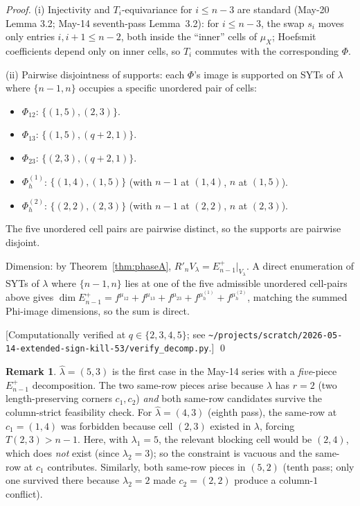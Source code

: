 \documentclass[11pt]{article}
\theoremstyle{definition}
\newtheorem{remark}[theorem]{Remark}
\newcommand{\hatl}{\widehat\lambda}
\newcommand{\Rp}{{R'}}
\begin{document}
\begin{proof}
(i) Injectivity and $T_i$-equivariance for $i \le n - 3$ are standard
(May-20 Lemma 3.2; May-14 seventh-pass Lemma~3.2): for $i \le n - 3$,
the swap $s_i$ moves only entries $i, i+1 \le n - 2$, both inside the
``inner'' cells of $\mu_X$; Hoefsmit coefficients depend only on inner
cells, so $T_i$ commutes with the corresponding $\Phi$.

(ii) Pairwise disjointness of supports: each $\Phi$'s image is
supported on SYTs of $\lambda$ where $\{n - 1, n\}$ occupies a specific
unordered pair of cells:
\begin{itemize}[topsep=0.2em,itemsep=0.1em]
\item $\Phi_{12}$: $\{(1, 5), (2, 3)\}$.
\item $\Phi_{13}$: $\{(1, 5), (q+2, 1)\}$.
\item $\Phi_{23}$: $\{(2, 3), (q+2, 1)\}$.
\item $\Phi_h^{(1)}$: $\{(1, 4), (1, 5)\}$ (with $n-1$ at $(1,4)$, $n$ at $(1, 5)$).
\item $\Phi_h^{(2)}$: $\{(2, 2), (2, 3)\}$ (with $n-1$ at $(2,2)$, $n$ at $(2, 3)$).
\end{itemize}
The five unordered cell pairs are pairwise distinct, so the supports
are pairwise disjoint.

Dimension: by Theorem~\ref{thm:phaseA}, $\Rp_n V_\lambda
= E_{n-1}^+|_{V_\lambda}$.  A direct enumeration of SYTs of $\lambda$
where $\{n-1, n\}$ lies at one of the five admissible unordered
cell-pairs above gives
$\dim E_{n-1}^+ = f^{\mu_{12}} + f^{\mu_{13}} + f^{\mu_{23}} +
f^{\mu_h^{(1)}} + f^{\mu_h^{(2)}}$,
matching the summed Phi-image dimensions, so the sum is direct.

[Computationally verified at $q \in \{2, 3, 4, 5\}$; see
\texttt{\textasciitilde/projects/scratch/2026-05-14-extended-sign-kill-53/verify\_decomp.py}.]
\qed
\end{proof}

\begin{remark}\label{rem:five-pieces}
$\hatl = (5, 3)$ is the first case in the May-14 series with a
\emph{five}-piece $E^+_{n-1}$ decomposition.  The two same-row pieces
arise because $\lambda$ has $r = 2$ (two length-preserving corners
$c_1, c_2$) \emph{and} both same-row candidates survive the
column-strict feasibility check.  For $\hatl = (4, 3)$ (eighth pass),
the same-row at $c_1 = (1, 4)$ was forbidden because cell $(2, 3)$
existed in $\lambda$, forcing $T(2, 3) > n-1$.  Here, with $\lambda_1
= 5$, the relevant blocking cell would be $(2, 4)$, which does
\emph{not} exist (since $\lambda_2 = 3$); so the constraint is vacuous
and the same-row at $c_1$ contributes.  Similarly, both same-row
pieces in $(5, 2)$ (tenth pass; only one survived there because
$\lambda_2 = 2$ made $c_2 = (2, 2)$ produce a column-$1$ conflict).
\end{remark}
\end{document}
